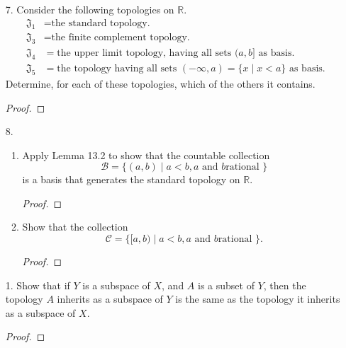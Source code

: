 \documentclass[12pt]{article}
\theoremstyle{definition}
\begin{document}
\begin{enumerate}
\begin{proof}
                \end{proof}
        \item[7.] Consider the following topologies on $\mathbb{R}$.
            \begin{equation*}
                \begin{split}
                    \mathfrak{J}_1&=\text{the standard topology.} \\
                    \mathfrak{J}_3&=\text{the finite complement topology.} \\
                    \mathfrak{J}_4&=\text{the upper limit topology, having all sets $(a, b]$ as basis.} \\
                    \mathfrak{J}_5&=\text{the topology having all sets $(-\infty, a)=\{x\mid x<a\}$ as basis.} 
                \end{split}
            \end{equation*}
            Determine, for each of these topologies, which of the others it
            contains.
                \begin{proof}
                    
                \end{proof}
        \item[8.] 
            \begin{enumerate}
                \item Apply Lemma 13.2 to show that the countable collection
                    \begin{equation*}
                        \mathcal{B}=\{(a, b)\mid a<b, a\text{ and  }b \text{
                        rational }\} 
                    \end{equation*}
                is a basis that generates the standard topology on
                $\mathbb{R}$.
                    \begin{proof}
                        
                    \end{proof}
                \item Show that the collection
                    \begin{equation*}
                        \mathcal{C}=\{[a, b)\mid a< b, a\text{ and }b \text{
                        rational }\}. 
                    \end{equation*}
                    \begin{proof}
                        
                    \end{proof}
            \end{enumerate}
        \item[1.] Show that if $Y$ is a subspace of $X$, and $A$ is a subset of
            $Y$, then the topology $A$ inherits as a subspace of $Y$ is the
            same as the topology it inherits as a subspace of $X$.
                \begin{proof}
                    
                \end{proof}
    \end{enumerate}
\end{document}
